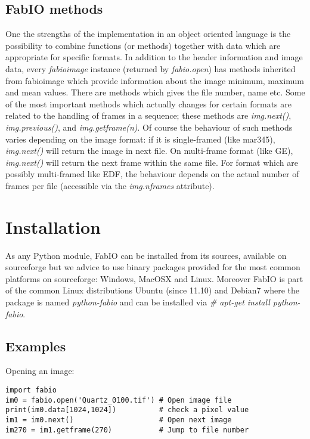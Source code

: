 \documentclass[preprint ]{iucr}
\begin{document}
\subsection{FabIO methods}

One the strengths of the implementation in an object oriented language
is the possibility to combine functions (or methods) together with data which
are appropriate for specific formats.
In addition to the header information and image data, every {\em fabioimage}
instance (returned by {\em fabio.open}) has methods inherited from fabioimage 
which provide information about the image minimum, maximum and mean values.
There are methods which gives the file number, name etc. 
Some of the most important methods which actually changes for certain formats 
are related to the handling of frames in a sequence; these methods are {\em
img.next()}, {\em img.previous()}, and {\em img.getframe(n)}.
Of course the behaviour of such methods varies depending on the
image format: if it is single-framed (like mar345),  {\em img.next()} will
return the image in next file. On multi-frame format (like GE), {\em img.next()}
will return the next frame within the same file. For format which are possibly multi-framed like
EDF, the behaviour depends on the actual number of frames per file (accessible
via the {\em img.nframes} attribute).


\section{Installation}

As any Python module, FabIO can be installed from its sources, available on 
sourceforge \cite{fabio} but we advice to use binary packages provided for the
most common platforms on sourceforge: Windows, MacOSX and Linux.
Moreover FabIO is part of the common Linux distributions Ubuntu (since 11.10)
and Debian7 where the package is named {\em python-fabio} and can be installed
via {\em \# apt-get install python-fabio}. 

\subsection{Examples}

Opening an image:\\
\begin{verbatim}
import fabio     
im0 = fabio.open('Quartz_0100.tif') # Open image file
print(im0.data[1024,1024])          # check a pixel value
im1 = im0.next()                    # Open next image
im270 = im1.getframe(270)           # Jump to file number
\end{verbatim}
\end{document}
